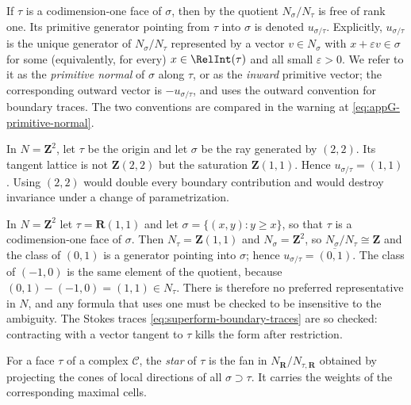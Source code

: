 If $\tau$ is a codimension-one face of $\sigma$, then by
 the
quotient $N_\sigma/N_\tau$ is free of rank one. Its primitive generator pointing
from $\tau$ into $\sigma$ is denoted $u_{\sigma/\tau}$.  Explicitly, $u_{\sigma/\tau}$
is the unique generator of $N_\sigma/N_\tau$ represented by a vector
$v\in N_\sigma$ with $x+\varepsilon v\in\sigma$ for some (equivalently, for
every) $x\in\RelInt(\tau)$ and all small $\varepsilon>0$.  We refer to it as
the \emph{primitive normal} of $\sigma$ along $\tau$, or as the
\emph{inward} primitive vector; the corresponding outward vector is
$-u_{\sigma/\tau}$, and  uses the outward
convention for boundary traces.  The two conventions are compared in the
warning at \eqref{eq:appG-primitive-normal}.

\begin{example}
\label{ex:ch10-primitive-ray}
In $N=\mathbf Z^2$, let $\tau$ be the origin and let $\sigma$ be the ray
generated by $(2,2)$.  Its tangent lattice is not
$\mathbf Z(2,2)$ but the saturation $\mathbf Z(1,1)$.  Hence
$u_{\sigma/\tau}=(1,1)$.  Using $(2,2)$ would double every boundary
contribution and would destroy invariance under a change of parametrization.
\end{example}

\begin{example}
\label{ex:ch10-primitive-quotient}
In $N=\mathbf Z^2$ let $\tau=\mathbf R(1,1)$ and let
$\sigma=\{(x,y):y\geq x\}$, so that $\tau$ is a codimension-one face of
$\sigma$.  Then $N_\tau=\mathbf Z(1,1)$ and
$N_\sigma=\mathbf Z^2$, so $N_\sigma/N_\tau\cong\mathbf Z$ and the class of
$(0,1)$ is a generator pointing into $\sigma$; hence
$u_{\sigma/\tau}=\overline{(0,1)}$.  The class of $(-1,0)$ is the same
element of the quotient, because $(0,1)-(-1,0)=(1,1)\in N_\tau$.  There is
therefore no preferred representative in $N$, and any formula that uses one
must be checked to be insensitive to the ambiguity.  The Stokes traces
\eqref{eq:superform-boundary-traces} are so checked: contracting with a
vector tangent to $\tau$ kills the form after restriction.
\end{example}

\begin{definition}
\label{def:ch10-star}
For a face $\tau$ of a complex $\mathscr C$, the \emph{star} of $\tau$ is the
fan in $N_{\mathbf R}/N_{\tau,\mathbf R}$ obtained by projecting the cones of
local directions of all $\sigma\supset\tau$.  It carries the weights of the
corresponding maximal cells.
\end{definition}

